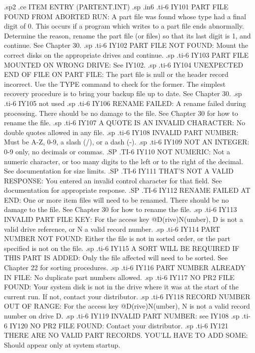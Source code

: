 .sp2
.ce
ITEM ENTRY (PARTENT.INT)
.sp
.in6
.ti-6
IY101 PART FILE FOUND FROM ABORTED RUN:  A part file was found whose type had
a final digit of 0.  This occurs if a program which writes to a part file
ends abnormally.  Determine the reason, rename the
part file (or files) so that its last digit is 1, and continue. See Chapter
30.
.sp
.ti-6
IY102 PART FILE NOT FOUND:  Mount the correct disks on the appropriate drives
and continue.
.sp
.ti-6
IY103 PART FILE MOUNTED ON WRONG DRIVE:  See IY102.
.sp
.ti-6
IY104 UNEXPECTED END OF FILE ON PART FILE:  The part file is null or the
header record incorrect.  Use the TYPE command to check for the former.
The simplest recovery procedure is to bring your backup file up to date.
See Chapter 30.
.sp
.ti-6
IY105 not used
.sp
.ti-6
IY106 RENAME FAILED: A rename failed during processing.  There should be no
damage to the file.  See Chapter 30 for how to rename the file.
.sp
.ti-6
IY107 A QUOTE IS AN INVALID CHARACTER: No double quotes allowed in any file.
.sp
.ti-6
IY108 INVALID PART NUMBER: Must be A-Z, 0-9,
a slash (/), or a dash (-).
.sp
.ti-6
IY109 NOT AN INTEGER: 0-9 only, no decimals or commas.
.SP
.TI-6
IY110 NOT NUMERIC: Not a numeric character, or
too many digits to the left or to the right of the decimal.
See documentation for size limits.
.SP
.TI-6
IY111 THAT'S NOT A VALID RESPONSE: You entered an invalid control character
for that field. See documentation for appropriate response.
.SP
.TI-6
IY112 RENAME FAILED AT END: One or more item files will need to be renamed.
There should be no damage to the file.	See Chapter 30 for how to rename the
file.
.sp
.ti-6
IY113 INVALID PART FILE KEY: For the access key @D(rive)N(umber), D is
not a valid drive reference, or N a valid record number.
.sp
.ti-6
IY114 PART NUMBER NOT FOUND: Either the file is not in sorted order, or
the part specified is not on the file.
.sp
.ti-6
IY115 A SORT WILL BE REQUIRED IF THIS PART IS ADDED: Only the file affected
will need to be sorted.  See Chapter 22 for sorting procedures.
.sp
.ti-6
IY116 PART NUMBER ALREADY IN FILE: No duplicate part numbers allowed.
.sp
.ti-6
IY117 NO PR2 FILE FOUND: Your system disk is not in the drive where it was
at the start of the current run.  If not, contact your distributor.
.sp
.ti-6
IY118 RECORD NUMBER OUT OF RANGE: For the access key @D(rive)N(umber),
N is not a valid record number on drive D.
.sp
.ti-6
IY119 INVALID PART NUMBER: see IY108
.sp
.ti-6
IY120 NO PR2 FILE FOUND: Contact your distributor.
.sp
.ti-6
IY121 THERE ARE NO VALID PART RECORDS. YOU'LL HAVE TO ADD SOME: Should
appear only at system startup.
